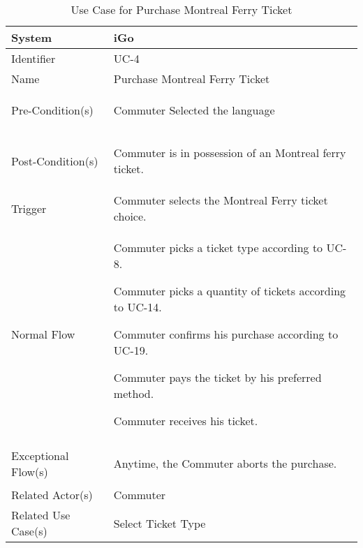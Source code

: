 \begin{table}[ht]
    \centering
    \begin{tabular}{|l|p{11cm}|}
         \hline
         System             & iGo\\
         \hline
         Identifier         & UC-4 \\
         \hline
         Name               & Purchase Montreal Ferry Ticket \\
         \hline
         Pre-Condition(s)   & 
         \begin{enumerate*}[itemjoin=\newline]
             \item Commuter Selected the language
         \end{enumerate*} \\
         \hline
         Post-Condition(s)  & 
         \begin{enumerate*}[itemjoin=\newline]
            \item Commuter is in possession of an Montreal ferry ticket. 
         \end{enumerate*} \\
         \hline
         Trigger            & Commuter selects the Montreal Ferry ticket choice. \\
         \hline
         Normal Flow        & 
         \begin{enumerate*}[itemjoin=\newline]
           \item Commuter picks a ticket type according to UC-8.
            \item Commuter picks a quantity of tickets according to UC-14.
            \item Commuter confirms his purchase according to UC-19.
            \item Commuter pays the ticket by his preferred method.
            \item Commuter receives his ticket.
         \end{enumerate*} \\
         \hline
         Exceptional Flow(s)& 
         \begin{enumerate*}[itemjoin=\newline]
             \item Anytime, the Commuter aborts the purchase.
         \end{enumerate*} \\
         \hline
         Related Actor(s)   & Commuter \\
         \hline
         Related Use Case(s)& Select Ticket Type\\
         \hline
    \end{tabular}
    \caption{Use Case for Purchase Montreal Ferry Ticket}
    \label{tab:UC_PurchaseMontrealFerryTicket}
\end{table}

